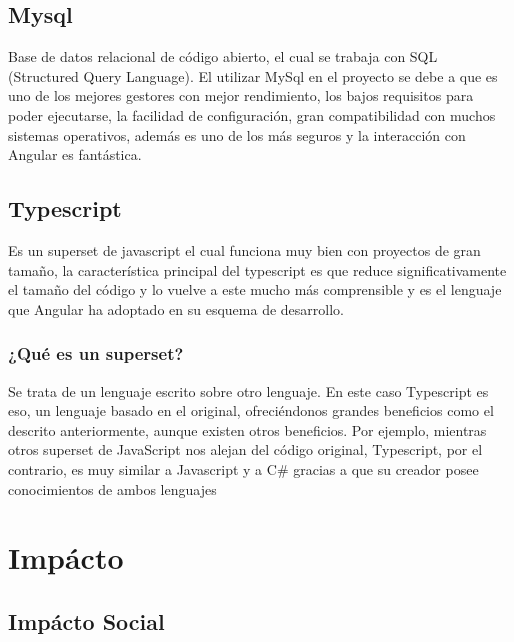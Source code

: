 \subsection{ Mysql}
Base de datos relacional de código abierto, el cual se trabaja con SQL (Structured Query Language).
El utilizar MySql en el proyecto se debe a que es uno de los mejores gestores con mejor rendimiento, los bajos requisitos para poder ejecutarse, la facilidad de configuración, gran compatibilidad con muchos sistemas operativos, además es uno de los más seguros y la interacción con Angular es fantástica. \cite{mysql}

\subsection{Typescript}
Es un superset de javascript el cual funciona muy bien con proyectos de gran tamaño, la característica principal del typescript es que reduce significativamente el tamaño del código y lo vuelve a este mucho más comprensible y es el lenguaje que Angular ha adoptado en su esquema de desarrollo.
\subsubsection{¿Qué es un superset?}

Se trata de un lenguaje escrito sobre otro lenguaje. En este caso Typescript es eso, un lenguaje basado en el original, ofreciéndonos grandes beneficios como el descrito anteriormente, aunque existen otros beneficios. Por ejemplo, mientras otros superset de JavaScript nos alejan del código original, Typescript, por el contrario, es muy similar a Javascript y a C# gracias a que su creador posee conocimientos de ambos lenguajes \cite{typeScript}

\section{Impácto}
\subsection{Impácto Social}

